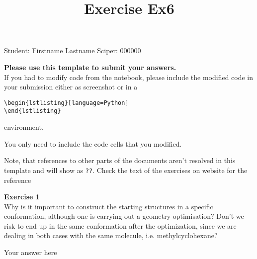 \documentclass{article}
\title{Exercise Ex6}
\begin{document}
\maketitle\maketitle
\begin{center}\logo\end{center}


Student:  Firstname Lastname    Sciper: 000000

\begin{mdframed}
\textbf{Please use this template to submit your answers.}\\
If you had to modify code from the notebook, please include the modified code in your submission either as screenshot or in a

\begin{verbatim}
\begin{lstlisting}[language=Python]
\end{lstlisting}
\end{verbatim}

environment.

You only need to include the code cells that you modified.

Note, that references to other parts of the documents aren't resolved in this template and will show as \texttt{??}. Check the text of the exercises on website for the reference
\end{mdframed}

\begin{mdframed}
\textbf{Exercise 1}\\
Why is it important to construct the starting structures in a specific conformation, although one is carrying out a geometry optimisation? Don't we risk to end up in the same conformation after the optimization, since we are dealing in both cases with the same molecule, i.e. methylcyclohexane?
\end{mdframed}

Your answer here
\end{document}
